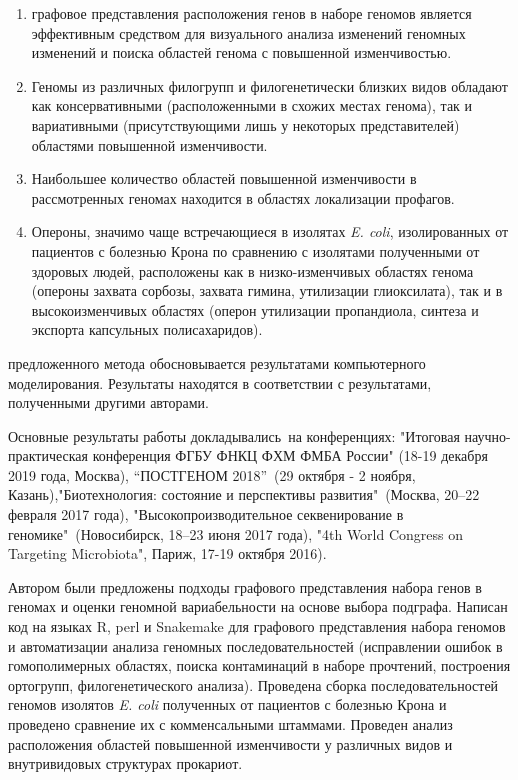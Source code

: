 
{}
\begin{enumerate}[beginpenalty=10000] %
	\item графовое представления расположения генов в наборе геномов является эффективным средством для визуального анализа изменений геномных изменений и поиска областей генома с повышенной изменчивостью.

	\item Геномы из различных филогрупп и филогенетически близких видов обладают как консервативными (расположенными в схожих местах генома), так и вариативными (присутствующими лишь у некоторых представителей) областями повышенной изменчивости.

 	\item Наибольшее количество областей повышенной изменчивости в рассмотренных геномах находится в областях локализации профагов.

	\item Опероны, значимо чаще встречающиеся в изолятах \textit{E. coli}, изолированных от пациентов с болезнью Крона по сравнению с изолятами полученными от здоровых людей, расположены как в низко-изменчивых областях генома (опероны захвата сорбозы, захвата гимина, утилизации глиоксилата), так и в высокоизменчивых областях (оперон утилизации пропандиола, синтеза и экспорта капсульных полисахаридов).

\end{enumerate}


{\reliability} предложенного метода обосновывается результатами компьютерного моделирования. Результаты находятся в соответствии с результатами, полученными другими авторами.

{\probation}
Основные результаты работы докладывались~на конференциях: "Итоговая научно-практическая конференция ФГБУ ФНКЦ ФХМ ФМБА России" (18-19 декабря 2019 года, Москва), “ПОСТГЕНОМ 2018”\  (29 октября - 2 ноября, Казань),"Биотехнология: состояние и перспективы развития"\ (Москва, 20–22 февраля 2017 года), "Высокопроизводительное секвенирование в геномике"\ (Новосибирск, 18–23 июня 2017 года), "4th World Congress on Targeting Microbiota", Париж,  17-19 октября 2016).


{\contribution} 
Автором были предложены подходы графового представления набора генов в геномах и оценки геномной вариабельности на основе выбора подграфа. Написан код на языках R, perl и Snakemake для графового представления набора геномов и автоматизации анализа геномных последовательностей (исправлении ошибок в гомополимерных областях, поиска контаминаций в наборе прочтений, построения ортогрупп, филогенетического анализа). Проведена сборка последовательностей геномов изолятов \textit{E. coli} полученных от пациентов с болезнью Крона и проведено сравнение их с комменсальными штаммами. Проведен анализ расположения областей повышенной изменчивости у различных видов и внутривидовых структурах прокариот.

